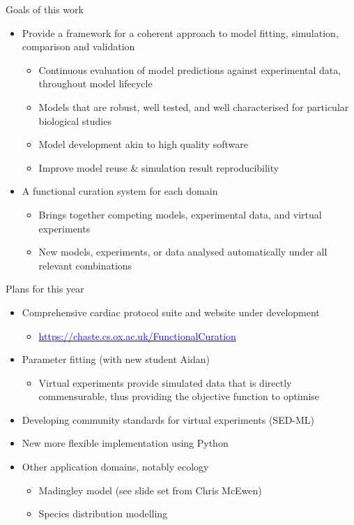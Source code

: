 \documentclass[t,xcolor={usenames,dvipsnames}]{beamer}
\newcommand{\myhref}[2]{\href{#1}{\textcolor{Blue}{#2}}}
\newcommand{\myurl}[1]{\myhref{#1}{#1}}
\newcommand{\subitem}[1]{\begin{itemize}[<.->]\item #1 \end{itemize}}
\begin{document}
\begin{frame}{Goals of this work}
\begin{itemize}
\item Provide a framework for a coherent approach to model fitting, simulation, comparison and validation
  \begin{itemize}
  \item Continuous evaluation of model predictions against experimental data, throughout model lifecycle
  \item Models that are robust, well tested, and well characterised for particular biological studies
  \item Model development akin to high quality software
  \item Improve model reuse \& simulation result reproducibility
  \end{itemize}
\item A functional curation system for each domain
  \begin{itemize}
  \item Brings together competing models, experimental data, and virtual experiments
  \item New models, experiments, or data analysed automatically under all relevant combinations
  \end{itemize}
\end{itemize}
\end{frame}


\begin{frame}{Plans for this year}
\begin{itemize}
\item Comprehensive cardiac protocol suite and website under development
  \subitem{\myurl{https://chaste.cs.ox.ac.uk/FunctionalCuration}}
\item Parameter fitting (with new student Aidan)
  \subitem{Virtual experiments provide simulated data that is directly commensurable, thus providing the objective function to optimise}
\item Developing community standards for virtual experiments (SED-ML)
\item New more flexible implementation using Python
\item Other application domains, notably ecology
  \begin{itemize}
  \item Madingley model (see slide set from Chris McEwen)
  \item Species distribution modelling
  \end{itemize}
\end{itemize}
\end{frame}
\end{document}
